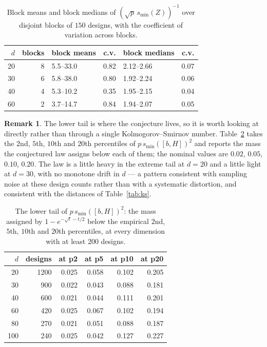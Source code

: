 \documentclass[11pt]{article}
\theoremstyle{definition}
\newtheorem{remark}[theorem]{Remark}
\begin{document}
\begin{table}[t]
\centering\small
\caption{Block means and block medians of $(\sqrt p\,s_{\min}(Z))^{-1}$ over disjoint blocks of
$150$ designs, with the coefficient of variation across blocks.}
\label{tab:invmoment}
\begin{tabular}{rrlrlr}
\toprule
$d$ & blocks & block means & c.v. & block medians & c.v.\\
\midrule
20 & 8 & 5.5--33.0 & 0.82 & 2.12--2.66 & 0.07\\
30 & 6 & 5.8--38.0 & 0.80 & 1.92--2.24 & 0.06\\
40 & 4 & 5.3--10.2 & 0.35 & 1.95--2.15 & 0.04\\
60 & 2 & 3.7--14.7 & 0.84 & 1.94--2.07 & 0.05\\
\bottomrule
\end{tabular}
\end{table}

\begin{remark}
The lower tail is where the conjecture lives, so it is worth looking at directly rather than through
a single Kolmogorov--Smirnov number. Table~\ref{tab:tail} takes the $2$nd, $5$th, $10$th and $20$th
percentiles of $p\,s_{\min}([b,H])^2$ and reports the mass the conjectured law assigns below each of
them; the nominal values are $0.02$, $0.05$, $0.10$, $0.20$. The law is a little heavy in the extreme
tail at $d=20$ and a little light at $d=30$, with no monotone drift in $d$ --- a pattern consistent
with sampling noise at these design counts rather than with a systematic distortion, and consistent
with the distances of Table~\ref{tab:ks}.
\end{remark}

\begin{table}[t]
\centering\small
\caption{The lower tail of $p\,s_{\min}([b,H])^2$: the mass assigned by $1-e^{-\sqrt t-t/2}$ below
the empirical $2$nd, $5$th, $10$th and $20$th percentiles, at every dimension with at least $200$
designs.}
\label{tab:tail}
\begin{tabular}{rrrrrr}
\toprule
$d$ & designs & at p2 & at p5 & at p10 & at p20\\
\midrule
20 & 1200 & 0.025 & 0.058 & 0.102 & 0.205\\
30 & 900 & 0.022 & 0.043 & 0.088 & 0.181\\
40 & 600 & 0.021 & 0.044 & 0.111 & 0.201\\
60 & 420 & 0.025 & 0.067 & 0.102 & 0.194\\
80 & 270 & 0.021 & 0.051 & 0.088 & 0.187\\
100 & 240 & 0.025 & 0.042 & 0.127 & 0.227\\
\bottomrule
\end{tabular}
\end{table}
\end{document}
